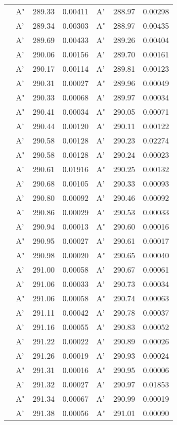 \documentclass[journal=jctcce,manuscript=article]{achemso}
\begin{document}
\begin{table}[H]
\begin{tabular}{l|lcc|lcc}
& A" & 289.33 & 0.00411	& A' & 288.97 & 0.00298 \\
& A' & 289.34 & 0.00303	& A" & 288.97 & 0.00435 \\
& A' & 289.69 & 0.00433	& A' & 289.26 & 0.00404 \\
& A' & 290.06 & 0.00156	& A' & 289.70 & 0.00161 \\
& A' & 290.17 & 0.00114	& A' & 289.81 & 0.00123 \\
& A' & 290.31 & 0.00027	& A" & 289.96 & 0.00049 \\
& A" & 290.33 & 0.00068	& A' & 289.97 & 0.00034 \\
& A" & 290.41 & 0.00034	& A" & 290.05 & 0.00071 \\
& A' & 290.44 & 0.00120	& A' & 290.11 & 0.00122 \\
& A' & 290.58 & 0.00128	& A' & 290.23 & 0.02274 \\
& A" & 290.58 & 0.00128	& A' & 290.24 & 0.00023 \\
& A' & 290.61 & 0.01916	& A" & 290.25 & 0.00132 \\
& A' & 290.68 & 0.00105	& A' & 290.33 & 0.00093 \\
& A' & 290.80 & 0.00092	& A' & 290.46 & 0.00092 \\
& A' & 290.86 & 0.00029	& A' & 290.53 & 0.00033 \\
& A' & 290.94 & 0.00013	& A" & 290.60 & 0.00016 \\
& A" & 290.95 & 0.00027	& A' & 290.61 & 0.00017 \\
& A" & 290.98 & 0.00020	& A" & 290.65 & 0.00040 \\
& A' & 291.00 & 0.00058	& A' & 290.67 & 0.00061 \\
& A' & 291.06 & 0.00033	& A' & 290.73 & 0.00034 \\
& A" & 291.06 & 0.00058	& A" & 290.74 & 0.00063 \\
& A' & 291.11 & 0.00042	& A' & 290.78 & 0.00037 \\
& A' & 291.16 & 0.00055	& A' & 290.83 & 0.00052 \\
& A' & 291.22 & 0.00022	& A' & 290.89 & 0.00026 \\
& A' & 291.26 & 0.00019	& A' & 290.93 & 0.00024 \\
& A" & 291.31 & 0.00016	& A" & 290.95 & 0.00006 \\
& A' & 291.32 & 0.00027	& A' & 290.97 & 0.01853 \\
& A" & 291.34 & 0.00067	& A' & 290.99 & 0.00019 \\
& A' & 291.38 & 0.00056	& A" & 291.01 & 0.00090 \\

\end{tabular}
\end{table}
\end{document}
